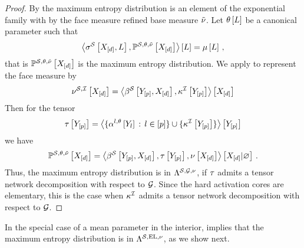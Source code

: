 \begin{proof}
    By  the maximum entropy distribution is an element of the exponential family with by the face measure refined base measure $\tilde{\nu}$.
    Let $\theta\left[L\right]$ be a canonical parameter such that
    \begin{align*}
        \left\langle \sigma^{\mathcal{S}}\left[X_{[d]},L\right],\mathbb{P}^{\mathcal{S},\theta,\tilde{\nu}}\left[X_{[d]}\right]\right\rangle \left[ L \right] = \mu\left[L\right] \, ,
    \end{align*}
    that is $\mathbb{P}^{\mathcal{S},\theta,\tilde{\nu}}\left[X_{[d]}\right]$ is the maximum entropy distribution.
    We apply  to represent the face measure by
    \begin{align*}
        \nu^{\mathcal{S},\mathcal{I}}\left[X_{[d]}\right] =
        \left\langle \beta^{\mathcal{S}}\left[Y_{[p]},X_{[d]}\right],\kappa^{\mathcal{I}}\left[Y_{[p]}\right]\right\rangle \left[ X_{[d]} \right]
    \end{align*}
    Then for the tensor
    \begin{align*}
        \tau\left[Y_{[p]}\right]
        = \left\langle 
            \{\alpha^{l,\theta}\left[Y_{l}\right]\,:\,l\in[p]\}
            \cup\{\kappa^{\mathcal{I}}\left[Y_{[p]}\right]\}\right\rangle \left[ Y_{[p]} \right]
    \end{align*}
    we have
    \begin{align*}
        \mathbb{P}^{\mathcal{S},\theta,\tilde{\nu}}\left[X_{[d]}\right]
        = \left\langle 
            \beta^{\mathcal{S}}\left[Y_{[p]},X_{[d]}\right], \tau\left[Y_{[p]}\right], \nu\left[X_{[d]}\right]
        \right\rangle \left[ X_{[d]} | \varnothing \right] \, .
    \end{align*}
    Thus, the maximum entropy distribution is in $\Lambda^{\mathcal{S},\mathcal{G},\nu}$, if $\tau$ admits a tensor network decomposition with respect to $\mathcal{G}$.
    Since the hard activation cores are elementary, this is the case when $\kappa^{\mathcal{I}}$ admits a tensor network decomposition with respect to $\mathcal{G}$.
\end{proof}

In the special case of a mean parameter in the interior,  implies that the maximum entropy distribution is in $\Lambda^{\mathcal{S},\mathrm{EL},\nu}$, as we show next.

